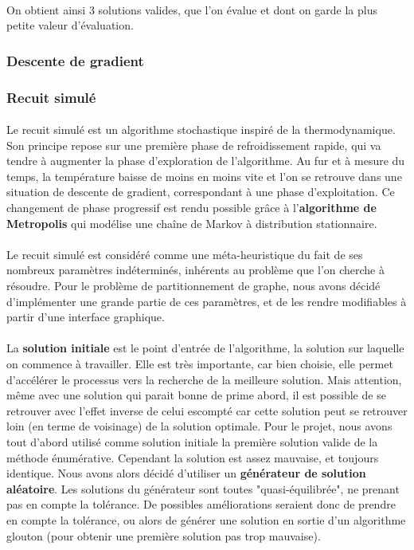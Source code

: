 \documentclass[12pt]{article}
\begin{document}
\paragraph{}On obtient ainsi 3 solutions valides, que l'on évalue et dont on garde la plus petite valeur d'évaluation.

\subsubsection{Descente de gradient}

\subsubsection{Recuit simulé}

\paragraph{}Le recuit simulé est un algorithme stochastique inspiré de la thermodynamique. Son principe repose sur une première phase de refroidissement rapide, qui va tendre à augmenter la phase d'exploration de l'algorithme. Au fur et à mesure du temps, la température baisse de moins en moins vite et l'on se retrouve dans une situation de descente de gradient, correspondant à une phase d'exploitation. Ce changement de phase progressif est rendu possible grâce à l'\textbf{algorithme de Metropolis} qui modélise une chaîne de Markov à distribution stationnaire.

\paragraph{}Le recuit simulé est considéré comme une méta-heuristique du fait de ses nombreux paramètres indéterminés, inhérents au problème que l'on cherche à résoudre. Pour le problème de partitionnement de graphe, nous avons décidé d'implémenter une grande partie de ces paramètres, et de les rendre modifiables à partir d'une interface graphique.

\paragraph{}La \textbf{solution initiale} est le point d'entrée de l'algorithme, la solution sur laquelle on commence à travailler. Elle est très importante, car bien choisie, elle permet d'accélérer le processus vers la recherche de la meilleure solution. Mais attention, même avec une solution qui parait bonne de prime abord, il est possible de se retrouver avec l'effet inverse de celui escompté car cette solution peut se retrouver loin (en terme de voisinage) de la solution optimale. Pour le projet, nous avons tout d'abord utilisé comme solution initiale la première solution valide de la méthode énumérative. Cependant la solution est assez mauvaise, et toujours identique. Nous avons alors décidé d'utiliser un \textbf{générateur de solution aléatoire}. Les solutions du générateur sont toutes "quasi-équilibrée", ne prenant pas en compte la tolérance. De possibles améliorations seraient donc de prendre en compte la tolérance, ou alors de générer une solution en sortie d'un algorithme glouton (pour obtenir une première solution pas trop mauvaise).
\end{document}
